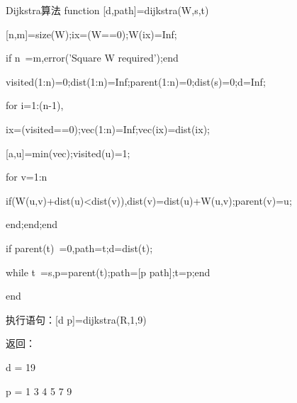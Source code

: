 \documentclass[12pt]{beamer}
\begin{document}
\begin{frame}[allowframebreaks]{Dijkstra算法}
function [d,path]=dijkstra(W,s,t)

[n,m]=size(W);ix=(W==0);W(ix)=Inf;

if n~=m,error('Square W required');end

visited(1:n)=0;dist(1:n)=Inf;parent(1:n)=0;dist(s)=0;d=Inf;

for i=1:(n-1),

ix=(visited==0);vec(1:n)=Inf;vec(ix)=dist(ix);

[a,u]=min(vec);visited(u)=1;

for v=1:n

if(W(u,v)+dist(u)<dist(v)),dist(v)=dist(u)+W(u,v);parent(v)=u;

end;end;end

if parent(t)~=0,path=t;d=dist(t);

while t~=s,p=parent(t);path=[p path];t=p;end

end

执行语句：[d p]=dijkstra(R,1,9)

返回：

d = 19

p = 1     3     4     5     7     9

\end{frame}
\end{document}
